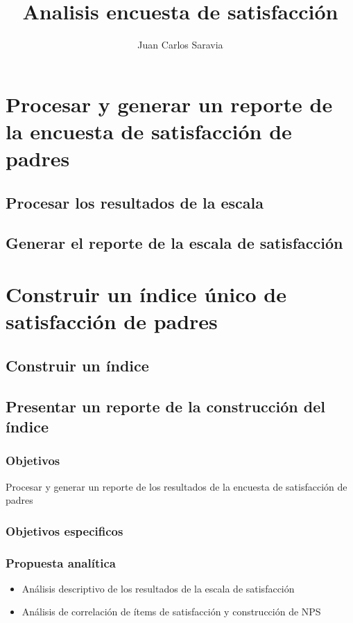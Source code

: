 \documentclass{beamer}
\title{Analisis encuesta de satisfacción}
\author{Juan Carlos Saravia}
\date{}
\begin{document}
\begin{frame}
\titlepage
\end{frame}


\section{Procesar y generar un reporte de la encuesta de satisfacción de padres}
\subsection{Procesar los resultados de la escala}
\subsection{Generar el reporte de la escala de satisfacción}

\section{Construir un índice único de satisfacción de padres}
\subsection{Construir un índice}
\subsection{Presentar un reporte de la construcción del índice}



\begin{frame}
\frametitle{Objetivos}
Procesar y generar un reporte de los resultados de la encuesta de satisfacción de padres
\end{frame}



\begin{frame}
\frametitle{Objetivos especificos}
\tableofcontents
\end{frame}

\begin{frame}
\frametitle{Propuesta analítica}

\begin{itemize}
\item Análisis descriptivo de los resultados de la escala de satisfacción
\item Análisis de correlación de ítems de satisfacción y construcción de NPS
\end{itemize}	

\end{frame}
\end{document}
